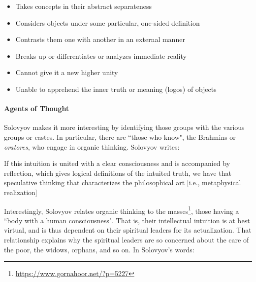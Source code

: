 \begin{itemize}
\item Takes concepts in their abstract separateness 
\item Considers objects under some particular, one-sided definition 
\item Contrasts them one with another in an external manner 
\item Breaks up or differentiates or analyzes immediate reality 
\item Cannot give it a new higher unity 
\item Unable to apprehend the inner truth or meaning (logos) of objects 
\end{itemize}
\paragraph{Agents of Thought}
Solovyov makes it more interesting by identifying those groups with the various groups or castes. In particular, there are ``those who know", the Brahmins or \emph{oratores}, who engage in organic thinking. Solovyov writes:

\begin{quotex}
If this intuition is united with a clear consciousness and is accompanied by reflection, which gives logical definitions of the intuited truth, we have that speculative thinking that characterizes the philosophical art [i.e., metaphysical realization] 

\end{quotex}
Interestingly, Solovyov relates organic thinking to the masses\footnote{\url{https://www.gornahoor.net/?p=5227}}, those having a ``body with a human consciousness". That is, their intellectual intuition is at best virtual, and is thus dependent on their spiritual leaders for its actualization. That relationship explains why the spiritual leaders are so concerned about the care of the poor, the widows, orphans, and so on. In Solovyov's words:

